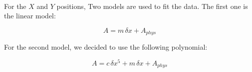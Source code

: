 \begin{figure}[hbtp]
\centering
{}
\\
\end{figure}

For the $X$ and $Y$ positions, Two models are used to fit the data. The first one is the linear model: 

\begin{equation}
A = m \, \delta x + A_{phys}
\end{equation}

For the second model, we decided to use the following polynomial:

\begin{equation}
A = c \, \delta x^{5} + m \, \delta x + A_{phys}
\end{equation}

